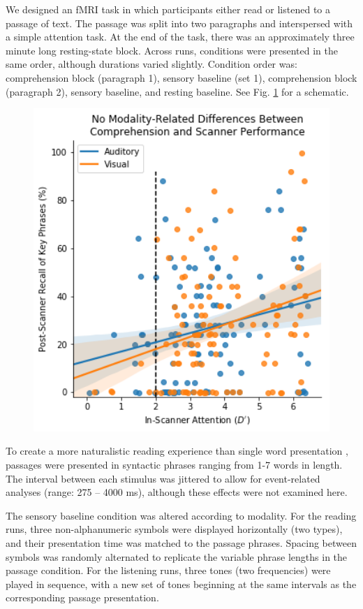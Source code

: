 We designed an fMRI task in which participants either read or listened to a passage of text. The passage was split into two paragraphs and interspersed with a simple attention task. At the end of the task, there was an approximately three minute long resting-state block. Across runs, conditions were presented in the same order, although durations varied slightly. Condition order was: comprehension block (paragraph 1), sensory baseline (set 1), comprehension block (paragraph 2), sensory baseline, and resting baseline. See Fig. \ref{fig:ch2-task-design} for a schematic.

\begin{figure}[tp]
	\centering
	\includegraphics[width=5in]{images/ch2-eprime-recall.png}
	\caption[Schematic of the reading comprehension task.]
	\label{fig:ch2-task-design}
\end{figure}

To create a more naturalistic reading experience than single word presentation \citep{Rayner1986}, passages were presented in syntactic phrases ranging from 1-7 words in length. The interval between each stimulus was jittered to allow for event-related analyses (range: 275 – 4000 ms), although these effects were not examined here.

The sensory baseline condition was altered according to modality. For the reading runs, three non-alphanumeric symbols were displayed horizontally (two types), and their presentation time was matched to the passage phrases. Spacing between symbols was randomly alternated to replicate the variable phrase lengths in the passage condition. For the listening runs, three tones (two frequencies) were played in sequence, with a new set of tones beginning at the same intervals as the corresponding passage presentation. 

